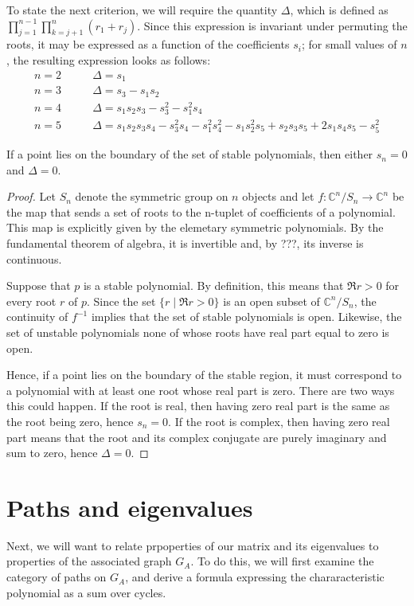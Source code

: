 To state the next criterion, we will require the quantity $\Delta$, which
is defined as $\prod_{j=1}^{n-1} \prod_{k=j+1}^n (r_1 + r_j)$.  Since
this expression is invariant under permuting the roots, it may be expressed
as a function of the coefficients $s_i$; for small values of $n$, the
resulting expression looks as follows:
\begin{align*}
n=2 \qquad &\Delta = s_1 \\
n=3 \qquad &\Delta = s_3 - s_1 s_2 \\
n=4 \qquad &\Delta = s_1 s_2 s_3 - s_3^2 - s_1^2 s_4 \\
n=5 \qquad &\Delta = s_1 s_2 s_3 s_4 - s_3^2 s_4 - s_1^2 s_4^2 -
                     s_1 s_2^2 s_5 + s_2 s_3 s_5 + 2 s_1 s_4 s_5 - s_5^2
\end{align*}

\begin{lemma}
If a point lies on the boundary of the set of stable polynomials, then
either $s_n = 0$ and $\Delta = 0$.
\end{lemma}

\begin{proof}
Let $S_n$ denote the symmetric group on $n$ objects and let $f \colon
\mathbb{C}^n/S_n \to \mathbb{C}^n$ be the map that sends a set of roots
to the n-tuplet of coefficients of a polynomial.  This map is explicitly
given by the elemetary symmetric polynomials.  By the fundamental theorem
of algebra, it is invertible and, by ???, its inverse is continuous.

Suppose that $p$ is a stable polynomial.  By definition, this means that
$\Re r > 0$ for every root $r$ of $p$.  Since the set $\{r \mid \Re r > 0\}$
is an open subset of $\mathbb{C}^n/S_n$, the continuity of $f^{-1}$ implies
that the set of stable polynomials is open.  Likewise, the set of unstable
polynomials none of whose roots have real part equal to zero is open.

Hence, if a point lies on the boundary of the stable region, it must
correspond to a polynomial with at least one root whose real part is zero.
There are two ways this could happen.  If the root is real, then having
zero real part is the same as the root being zero, hence $s_n = 0$.  If
the root is complex, then having zero real part means that the root and
its complex conjugate are purely imaginary and sum to zero, hence $\Delta = 0$.
\end{proof}

\section{Paths and eigenvalues}
Next, we will want to relate prpoperties of our matrix and its eigenvalues
to  properties of the associated graph $G_A$.  To do this, we will first
examine the category of paths on $G_A$, and derive a formula expressing
the chararacteristic polynomial as a sum over cycles.

